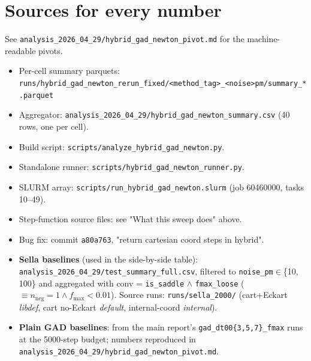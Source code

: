 \documentclass[11pt]{article}
\begin{document}
\section*{Sources for every number}

See \texttt{analysis\_2026\_04\_29/hybrid\_gad\_newton\_pivot.md} for the
machine-readable pivots.

\begin{itemize}[leftmargin=1.5em, itemsep=0.05em]
\item Per-cell summary parquets:
  \texttt{runs/hybrid\_gad\_newton\_rerun\_fixed/<method\_tag>\_<noise>pm/summary\_*.parquet}
\item Aggregator:
  \texttt{analysis\_2026\_04\_29/hybrid\_gad\_newton\_summary.csv}
  (40 rows, one per cell).
\item Build script: \texttt{scripts/analyze\_hybrid\_gad\_newton.py}.
\item Standalone runner: \texttt{scripts/hybrid\_gad\_newton\_runner.py}.
\item SLURM array: \texttt{scripts/run\_hybrid\_gad\_newton.slurm}
  (job 60460000, tasks 10--49).
\item Step-function source files: see "What this sweep does" above.
\item Bug fix: commit \texttt{a80a763}, "return cartesian coord steps in hybrid".
\item \textbf{Sella baselines} (used in the side-by-side table):
  \texttt{analysis\_2026\_04\_29/test\_summary\_full.csv}, filtered to
  \texttt{noise\_pm}$\in$\{10, 100\} and aggregated with
  conv = \texttt{is\_saddle} $\wedge$ \texttt{fmax\_loose}
  ($\equiv n_{\text{neg}}{=}1 \wedge f_{\max}{<}0.01$).
  Source runs: \texttt{runs/sella\_2000/} (cart+Eckart \emph{libdef},
  cart no-Eckart \emph{default}, internal-coord \emph{internal}).
\item \textbf{Plain GAD baselines}: from the main report's
  \texttt{gad\_dt00\{3,5,7\}\_fmax} runs at the 5000-step budget;
  numbers reproduced in
  \texttt{analysis\_2026\_04\_29/hybrid\_gad\_newton\_pivot.md}.
\end{itemize}
\end{document}
